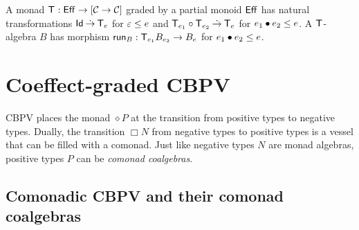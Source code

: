 \documentclass[acmsmall,review,anonymous]{acmart}\settopmatter{printfolios=true,printccs=false,printacmref=false}
\newcommand{\graybox}[1]{\grayboxtext{$#1$}}
\begin{document}
A monad $\T : \Eff \to [\CC \to \CC]$ graded by a partial monoid
$\Eff$ has natural transformations $\Id \todot \T[e]$ for $\Ge \leq e$
and $\T[e_1] \circ \T[e_2] \todot \T[e]$ for $e_1 \bu e_2 \leq e$.  A
$\T$-algebra $B$ has morphism $\run[B] : \T[e_1]B_{e_2} \to B_{e}$
for $e_1 \bu e_2 \leq e$.



\section{Coeffect-graded CBPV}
\label{sec:coeff}

\newcommand{\lolli}{\multimap}
\newcommand{\qfun}[3]{#1#2 \lolli #3}
\newcommand{\gqfun}[3]{\graybox{#1#2 \lolli #3}}
\renewcommand{\CompTy}[3]{#1 \vdash #2 : #3}
\newcommand{\nbox}[1]{}
\newcommand{\tzip}{\mathsf{zip}}
\newcommand{\textract}{\mathsf{extract}}
\newcommand{\extract}[1][]{\textract_{#1}}
\newcommand{\tdisplay}{\mathsf{display}}
\newcommand{\display}[1][]{\tdisplay_{#1}}
\newcommand{\tduplicate}{\mathsf{duplicate}}
\newcommand{\duplicate}[1][]{\tduplicate_{#1}}
\newcommand{\tcobind}{\mathsf{cobind}}
\newcommand{\tbind}{\mathsf{bind}}
\newcommand{\tget}{\mathsf{get}}
\newcommand{\tmodify}{\mathsf{modify}}
\newcommand{\thead}{\mathsf{head}}
\newcommand{\ttail}{\mathsf{tail}}
\newcommand{\suc}{(\_{+}1)}
\newcommand{\Float}{\mathsf{Float}}
\newcommand{\tiso}{\mathsf{iso}}
\newcommand{\isot}{\tiso^\otimes}

CBPV places the monad $\diamond P$ at the transition from positive
types to negative types.  Dually, the transition $\Box N$ from
negative types to positive types is a vessel that can be filled with a
comonad.  Just like negative types $N$ are monad algebras, positive
types $P$ can be \emph{comonad coalgebras}.

\subsection{Comonadic CBPV and their comonad coalgebras}

\end{document}
